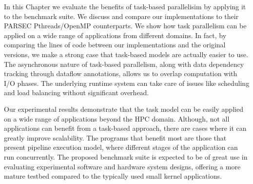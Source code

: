 
In this Chapter we evaluate the benefits of task-based parallelisim by applying it to the \PARSEC{} benchmark suite.
We discuss and compare our implementations to their
PARSEC Pthreads/OpenMP counterparts. 
We show how task parallelism can be applied on a wide range of applications from 
different domains.   
In fact, by comparing the lines of code between our implementations and the original versions, we make a strong case
that task-based  models are actually easier to use.
The asynchronous nature of task-based parallelism, along with data dependency tracking through dataflow annotations, allows
us to overlap computation with I/O phases.
The underlying runtime system can take care of issues like scheduling and load balancing without significant overhead. 

Our experimental results demonstrate that the task model can be easily applied on a wide range of applications beyond the HPC domain. 
Although, not all applications can benefit from a task-based approach, there are cases where 
it can greatly improve scalability. 
The programs that benefit most are those that present pipeline execution model, where different stages of the application can run concurrently.
The proposed benchmark suite is expected to be of great use in evaluating experimental software
and hardware system designs, offering a more mature testbed compared to the typically used
small kernel applications.
